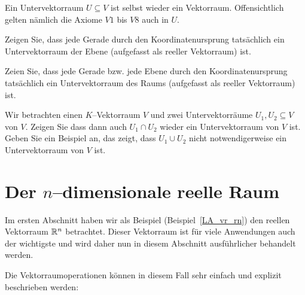 \begin{notiz}
Ein Untervektorraum $U \subseteq V$ ist selbst wieder ein Vektorraum. Offensichtlich gelten nämlich die 
Axiome $V1$ bis $V8$ auch in $U$.
\end{notiz}

\bigbreak

\begin{aufgabe}
Zeigen Sie, dass jede Gerade durch den Koordinatenursprung tatsächlich ein Untervektorraum der 
Ebene (aufgefasst als reeller Vektorraum) ist. 
\end{aufgabe}

\begin{aufgabe}
Zeien Sie, dass jede Gerade bzw. jede Ebene durch den Koordinatenursprung tatsächlich ein Untervektorraum des 
Raums (aufgefasst als reeller Vektorraum) ist. 
\end{aufgabe} 

\begin{aufgabe}
Wir betrachten einen $K$--Vektorraum $V$ und zwei Untervektorräume $U_1, U_2 \subseteq V$ von $V$. Zeigen 
Sie dass dann auch $U_1 \cap U_2$ wieder ein Untervektorraum von $V$ ist. Geben Sie ein Beispiel an, das zeigt, 
dass $U_1 \cup U_2$ nicht notwendigerweise ein Untervektorraum von $V$ ist.
\end{aufgabe}

\section{Der $n$--dimensionale reelle Raum}\label{section_rn}

\setcounter{definition}{0}
\setcounter{beispiel}{0}
\setcounter{notiz}{0}

Im ersten Abschnitt haben wir als Beispiel (Beispiel~\ref{LA_vr_rn}) den reellen Vektorraum $\mathbb R^n$ 
betrachtet. Dieser Vektorraum ist für viele Anwendungen auch der wichtigste und wird daher nun in 
diesem Abschnitt ausführlicher behandelt werden. 

Die Vektorraumoperationen können in diesem Fall sehr einfach und explizit beschrieben werden: 


